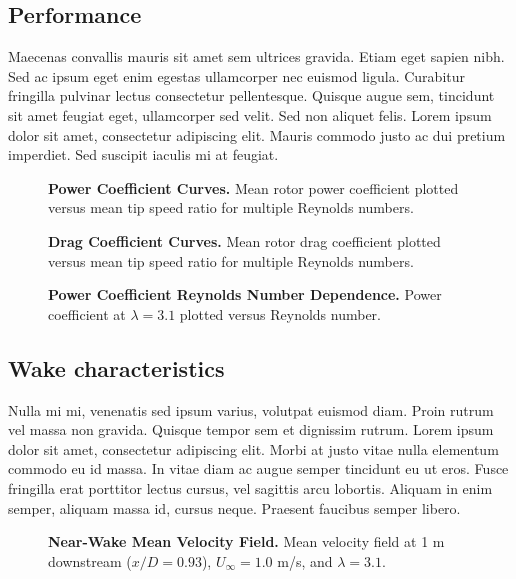 \documentclass[10pt,letterpaper]{article}
\begin{document}
\subsection*{Performance}

Maecenas convallis mauris sit amet sem ultrices gravida. Etiam eget sapien nibh.
Sed ac ipsum eget enim egestas ullamcorper nec euismod ligula. Curabitur
fringilla pulvinar lectus consectetur pellentesque. Quisque augue sem, tincidunt
sit amet feugiat eget, ullamcorper sed velit. Sed non aliquet felis. Lorem ipsum
dolor sit amet, consectetur adipiscing elit. Mauris commodo justo ac dui pretium
imperdiet. Sed suscipit iaculis mi at feugiat.


\begin{figure}[h]
\caption{{\bf Power Coefficient Curves.}
Mean rotor power coefficient plotted versus mean tip speed ratio for multiple
Reynolds numbers.}
\label{cp-curves}
\end{figure}


\begin{figure}[h]
\caption{{\bf Drag Coefficient Curves.}
Mean rotor drag coefficient plotted versus mean tip speed ratio for multiple
Reynolds numbers.}
\label{cd-curves}
\end{figure}


\begin{figure}[h]
\caption{{\bf Power Coefficient Reynolds Number Dependence.}
Power coefficient at $\lambda=3.1$ plotted versus Reynolds number.}
\label{cp-re-dep}
\end{figure}


\subsection*{Wake characteristics}

Nulla mi mi, venenatis sed ipsum varius, volutpat euismod diam. Proin rutrum vel
massa non gravida. Quisque tempor sem et dignissim rutrum. Lorem ipsum dolor sit
amet, consectetur adipiscing elit. Morbi at justo vitae nulla elementum commodo
eu id massa. In vitae diam ac augue semper tincidunt eu ut eros. Fusce fringilla
erat porttitor lectus cursus, vel sagittis arcu lobortis. Aliquam in enim
semper, aliquam massa id, cursus neque. Praesent faucibus semper libero.


\begin{figure}[h]
\caption{{\bf Near-Wake Mean Velocity Field.}
Mean velocity field at 1 m downstream ($x/D=0.93$), $U_\infty=1.0$ m/s, and
$\lambda=3.1$.}
\label{meancontquiv}
\end{figure}
\end{document}
